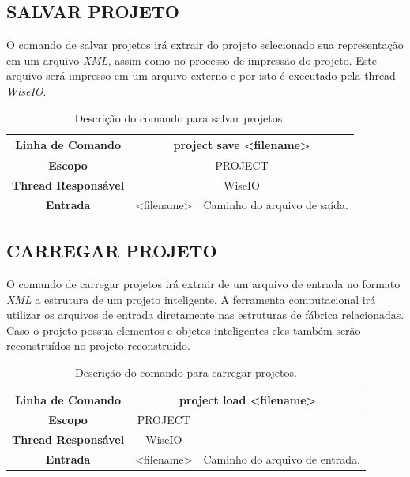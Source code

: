 \subsection{SALVAR PROJETO}\label{sec:save_projects}

O comando de salvar projetos irá extrair do projeto selecionado sua representação em um arquivo \textit{XML}, assim como no processo de impressão do projeto. Este arquivo será impresso em um arquivo externo e por isto é executado pela thread \textit{WiseIO}.

\begin{center}
	\begin{table}[!htbp]
		\begin{tabularx}{\textwidth}{c|c|X}
			\toprule
			\textbf{Linha de Comando} & \multicolumn{2}{c}{project save <file\underline{\space\space}name>} \\
			\midrule
			\textbf{Escopo} & \multicolumn{2}{c}{PROJECT} \\
			\hline
			\textbf{Thread Responsável} & \multicolumn{2}{c}{WiseIO} \\
			\hline
			\textbf{Entrada} & <file\underline{\space\space}name> & Caminho do arquivo de saída. \\
			\bottomrule
		\end{tabularx}
		\caption{Descrição do comando para salvar projetos.}
		\label{tab:save_project}
	\end{table}
\end{center}

\subsection{CARREGAR PROJETO}\label{sec:load_projects}

O comando de carregar projetos irá extrair de um arquivo de entrada no formato \textit{XML} a estrutura de um projeto inteligente. A ferramenta computacional irá utilizar os arquivos de entrada diretamente nas estruturas de fábrica relacionadas. Caso o projeto possua elementos e objetos inteligentes eles também serão reconstruídos no projeto reconstruído.

\begin{center}
	\begin{table}[!htbp]
		\begin{tabularx}{\textwidth}{c|c|X}
			\toprule
			\textbf{Linha de Comando} & \multicolumn{2}{c}{project load <filename>} \\
			\midrule
			\textbf{Escopo} & \multicolumn{1}{c}{PROJECT} \\
			\hline
			\textbf{Thread Responsável} & \multicolumn{1}{c}{WiseIO} \\
			\hline
			\textbf{Entrada} & <filename> & Caminho do arquivo de entrada. \\
			\bottomrule
		\end{tabularx}
		\caption{Descrição do comando para carregar projetos.}
		\label{tab:load_project}
	\end{table}
\end{center}

